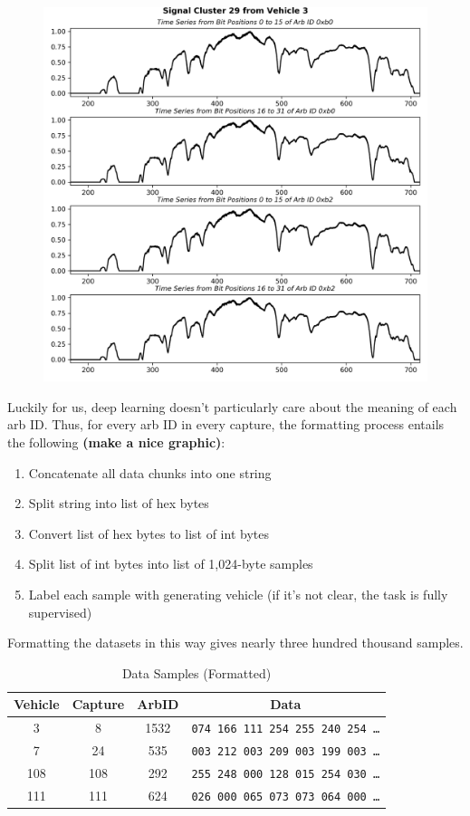 \documentclass[10pt]{article}
\newcommand{\newpar}{\medskip \noindent}
\begin{document}
\begin{figure}
    \centerline{\includegraphics[scale=0.4]{can-signals.png}}
\end{figure}

\newpar Luckily for us, deep learning doesn't particularly care about the meaning of each arb ID. Thus, for every arb ID in every capture, the formatting process entails the following \textbf{(make a nice graphic)}:

\begin{enumerate}
    \item Concatenate all data chunks into one string
    \item Split string into list of hex bytes
    \item Convert list of hex bytes to list of int bytes
    \item Split list of int bytes into list of 1,024-byte samples
    \item Label each sample with generating vehicle (if it's not clear, the task is fully supervised)
\end{enumerate}

\newpar Formatting the datasets in this way gives nearly three hundred thousand samples.

\begin{table}
    \caption*{Data Samples (Formatted)}
    \centering
    \begin{tabular}{|c|c|c|c|}
    \hline
    \textbf{Vehicle} & \textbf{Capture} & \textbf{ArbID} & \textbf{Data} \\
    \hline
    3   & 8   & 1532 & \texttt{074 166 111 254 255 240 254 \ldots} \\
    7   & 24  & 535  & \texttt{003 212 003 209 003 199 003 \ldots} \\
    108 & 108 & 292  & \texttt{255 248 000 128 015 254 030 \ldots} \\
    111 & 111 & 624  & \texttt{026 000 065 073 073 064 000 \ldots} \\
    \hline
    \end{tabular}
\end{table}
\end{document}
